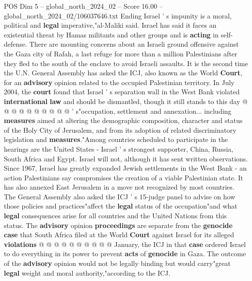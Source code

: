 \begin{textsample}{POS Dim 5 – global\_north\_2024\_02 – Score 16.00 – global\_north\_2024\_02/106037646.txt}
Ending Israel ' s impunity is a moral, political and \textbf{legal} imperative,"al-Maliki said.
Israel has said it faces an existential threat by Hamas militants and other groups and is \textbf{acting} in self-defense.
There are mounting concerns about an Israeli ground offensive against the Gaza city of Rafah, a last refuge for more than a million Palestinians after they fled to the south of the enclave to avoid Israeli assaults.
It is the second time the U.N.
General Assembly has asked the ICJ, also known as the World \textbf{Court}, for an \textbf{advisory} opinion related to the occupied Palestinian territory.
In July 2004, the \textbf{court} found that Israel ' s separation wall in the West Bank violated \textbf{international} \textbf{law} and should be dismantled, though it still stands to this day @ @ @ @ @ @ @ @ @ @ ' s"occupation, settlement and annexation... including \textbf{measures} aimed at altering the demographic composition, character and status of the Holy City of Jerusalem, and from its adoption of related discriminatory legislation and \textbf{measures}."Among countries scheduled to participate in the hearings are the United States - Israel ' s strongest supporter, China, Russia, South Africa and Egypt.
Israel will not, although it has sent written observations.
Since 1967, Israel has greatly expanded Jewish settlements in the West Bank - an action Palestinians say compromises the creation of a viable Palestinian state.
It has also annexed East Jerusalem in a move not recognized by most countries.
The General Assembly also asked the ICJ ' s 15-judge panel to advise on how those policies and practices"affect the \textbf{legal} status of the occupation"and what \textbf{legal} consequences arise for all countries and the United Nations from this status.
The \textbf{advisory} opinion \textbf{proceedings} are separate from the \textbf{genocide} \textbf{case} that South Africa filed at the World \textbf{Court} against Israel for its alleged \textbf{violations} @ @ @ @ @ @ @ @ @ @ January, the ICJ in that \textbf{case} ordered Israel to do everything in its power to prevent \textbf{acts} of \textbf{genocide} in Gaza.
The outcome of the \textbf{advisory} opinion would not be legally binding but would carry"great \textbf{legal} weight and moral authority,"according to the ICJ.

\end{textsample}
